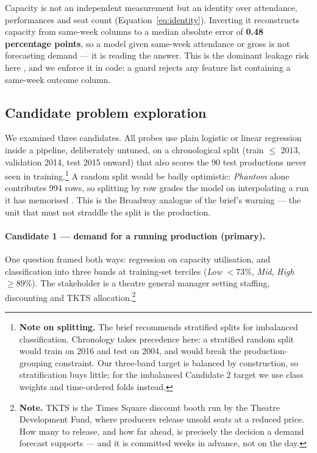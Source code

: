 Capacity is not an independent measurement but an identity over attendance,
performances and seat count (Equation~\ref{eq:identity}). Inverting it
reconstructs capacity from same-week columns to a median absolute error of
\textbf{0.48 percentage points}, so a model given same-week attendance or gross
is not forecasting demand --- it is reading the answer. This is the dominant
leakage risk here \citep{kaufman2012leakage}, and we enforce it in code: a guard
rejects any feature list containing a same-week outcome column.

\subsection{Candidate problem exploration}
\label{sec:candidates}

We examined three candidates. All probes use plain logistic or linear regression
inside a  pipeline, deliberately untuned, on a chronological
split (train $\le$ 2013, validation 2014, test 2015 onward) that also scores the
90 test productions never seen in training.\footnote{%
\textbf{Note on splitting.} The brief recommends stratified splits for
imbalanced classification. Chronology takes precedence here: a stratified
random split would train on 2016 and test on 2004, and would break the
production-grouping constraint. Our three-band target is balanced by
construction, so stratification buys little; for the imbalanced Candidate 2
target we use class weights and time-ordered folds instead.}
A random split would be badly optimistic: \emph{Phantom} alone contributes 994
rows, so splitting by row grades the model on interpolating a run it has
memorised \citep{bergmeir2012cv}. This is the Broadway analogue of the brief's
 warning --- the unit that must not straddle the split is the
production.

\paragraph{Candidate 1 --- demand for a running production (primary).}
One question framed both ways: regression on capacity utilisation, and
classification into three bands at training-set terciles (\emph{Low} $<73\%$,
\emph{Mid}, \emph{High} $\ge 89\%$). The stakeholder is a theatre general
manager setting staffing, discounting and TKTS allocation.\footnote{%
\textbf{Note.} TKTS is the Times Square discount booth run by the Theatre
Development Fund, where producers release unsold seats at a reduced price. How
many to release, and how far ahead, is precisely the decision a demand forecast
supports --- and it is committed weeks in advance, not on the day.}

